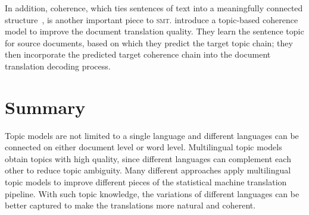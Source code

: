 In addition, coherence, which ties sentences of text into a meaningfully
connected structure~\citep{xiong-13}, is another important piece to
\textsc{smt}. \citet{xiong-13} introduce a topic-based coherence model
to improve the document translation quality. They learn the sentence
topic for source documents, based on which they predict the target
topic chain; they then incorporate the predicted target coherence
chain into the document translation decoding process.

\section{Summary}

Topic models are not limited to a single language and different
languages can be connected on either document level or word
level. Multilingual topic models obtain topics with high quality,
since different languages can complement each other to reduce topic
ambiguity. Many different approaches apply multilingual topic models
to improve different pieces of the statistical machine translation pipeline. With
such topic knowledge, the variations of different languages can be
better captured to make the translations more natural and coherent.
